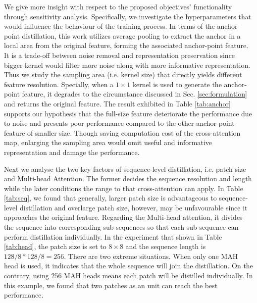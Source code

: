 \documentclass[10pt,twocolumn,letterpaper]{article}
\begin{document}
We give more insight with respect to the proposed objectives' functionality through sensitivity analysis. Specifically, we investigate the hyperparameters that would influence the behaviour of the training process. In terms of the anchor-point distillation, this work utilizes average pooling to extract the anchor in a local area from the original feature, forming the associated anchor-point feature. It is a trade-off between noise removal and representation preservation since bigger kernel would filter more noise along with more informative representation. Thus we study the sampling area (i.e. kernel size) that directly yields different feature resolution. Specially, when a $1\times 1$ kernel is used to generate the anchor-point feature, it degrades to the circumstance discussed in Sec. \ref{sec:formulation} and returns the original feature.
The result exhibited in Table \ref{tab:anchor} supports our hypothesis that the full-size feature deteriorate the performance due to noise and presents poor performance compared to the other anchor-point feature of smaller size. Though saving computation cost of the cross-attention map, enlarging the sampling area would omit useful and informative representation and damage the performance.

Next we analyse the two key factors of sequence-level distillation, i.e. patch size and Multi-head Attention. The former decides the sequence resolution and length while the later conditions the range to that cross-attention can apply. In Table \ref{tab:seq}, we found that generally, larger patch size is advantageous to sequence-level distillation and overlarge patch size, however, may be unfavourable since it approaches the original feature.  Regarding the Multi-head attention, it divides the sequence into corresponding sub-sequences so that each sub-sequence can perform distillation individually. In the experiment that shown in Table \ref{tab:head}, the patch size is set to $8\times 8$ and the sequence length is $128/8*128/8=256$. There are two extreme situations. When only one MAH head is used, it indicates that the whole sequence will join the distillation. On the contrary, using 256 MAH heads means each patch will be distilled individually. In this example, we found that two patches as an unit can reach the best performance.
\end{document}
